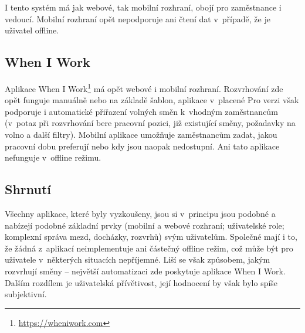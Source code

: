 \documentclass[twoside]{ctuthesis}
\begin{document}
I tento systém má jak webové, tak mobilní rozhraní, obojí pro zaměstnance i vedoucí. Mobilní rozhraní opět nepodporuje ani čtení dat v~případě, že je uživatel offline.

\subsection{When I Work}
Aplikace When I Work\footnote{\url{https://wheniwork.com}} má opět webové i mobilní rozhraní. Rozvrhování zde opět funguje manuálně nebo na základě šablon, aplikace v~placené Pro verzi \cite{wheinwork2020pricing} však podporuje i automatické přiřazení volných směn k~vhodným zaměstnancům (v~potaz při rozvrhování bere pracovní pozici, již existující směny, požadavky na volno a další filtry). \cite{wheinwork2020employee} Mobilní aplikace umožňuje zaměstnancům zadat, jakou pracovní dobu preferují nebo kdy jsou naopak nedostupní. Ani tato aplikace nefunguje v~offline režimu.

\subsection{Shrnutí}
Všechny aplikace, které byly vyzkoušeny, jsou si v~principu jsou podobné a nabízejí podobné základní prvky (mobilní a webové rozhraní; uživatelské role; komplexní správa mezd, docházky, rozvrhů) svým uživatelům. Společné mají i to, že žádná z~aplikací neimplementuje ani částečný offline režim, což může být pro uživatele v~některých situacích nepříjemné. Liší se však způsobem, jakým rozvrhují směny -- největší automatizaci zde poskytuje aplikace When I Work. Dalším rozdílem je uživatelská přívětivost, její hodnocení by však bylo spíše subjektivní.
\end{document}
